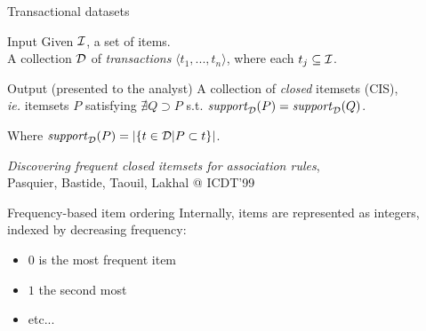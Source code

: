 \documentclass[table]{beamer}
\begin{document}
\begin{frame}{Transactional datasets}
  \begin{block}{Input}
    Given ${\cal I}$, a set of items.\\
    A collection ${\cal D}$ of {\em transactions} $\langle t_1,...,t_n\rangle$,
    where each $t_j \subseteq {\cal I}$.
  \end{block}
  \pause
  \begin{block}{Output (presented to the analyst)}
    A collection of {\em closed} itemsets (CIS),\\
    {\em ie.} itemsets $P$ satisfying
    $\nexists Q \supset P$ s.t. $\mathit{support}_{\cal D}(P) = \mathit{support}_{\cal D}(Q)$.
  \end{block}
  Where $\mathit{support}_{\cal D}(P) = |\{t \in {\cal D} | P \subset t\}|$.
  \vfill
	\begin{footnotesize}
    [12] {\em Discovering frequent closed itemsets for association rules}, \\
    Pasquier, Bastide, Taouil, Lakhal @ ICDT'99
	\end{footnotesize}
\end{frame}


\begin{frame}{Frequency-based item ordering}
  Internally, items are represented as integers, indexed by decreasing frequency:
  \begin{itemize}
    \item $0$ is the most frequent item
    \item $1$ the second most
    \item etc...
  \end{itemize}
\end{frame}
\end{document}
